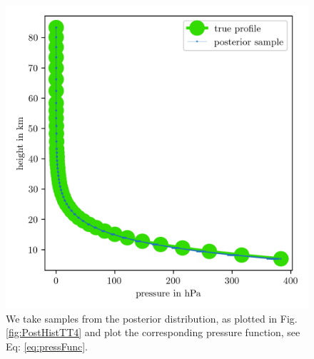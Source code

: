 \begin{figure}[ht!]
	\centering
	\includegraphics{PressPostMeanSigm.png}
	\caption[Pressure posterior samples.]{We take samples from the posterior distribution, as plotted in Fig. \ref{fig:PostHistTT4} and plot the corresponding pressure function, see Eq: \ref{eq:pressFunc}.}
	\label{fig:PressPost}
\end{figure}





